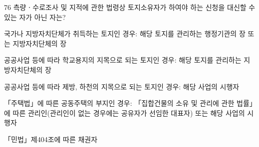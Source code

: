\begin{question}{76}
측량ㆍ수로조사 및 지적에 관한 법령상 토지소유자가 하여야 하는 신청을 대신할 수 있는 자가 아닌 자는?
\begin{choices}
  \item 국가나 지방자치단체가 취득하는 토지인 경우: 해당 토지를 관리하는 행정기관의 장 또는 지방자치단체의 장
  \item 공공사업 등에 따라 학교용지의 지목으로 되는 토지인 경우: 해당 토지를 관리하는 지방자치단체의 장
  \item 공공사업 등에 따라 제방, 하천의 지목으로 되는 토지인 경우: 해당 사업의 시행자
  \item 「주택법」에 따른 공동주택의 부지인 경우: 「집합건물의 소유 및 관리에 관한 법률」에 따른 관리인(관리인이 없는 경우에는 공유자가 선임한 대표자) 또는 해당 사업의 시행자
  \item 「민법」제404조에 따른 채권자
\end{choices}
\end{question}
